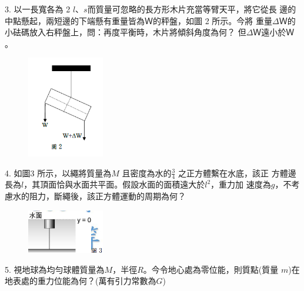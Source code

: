 \documentclass[cn,10pt,math=newtx,chinesefont=founder,device=ig]{elegantbook}
\begin{document}
\begin{example}
   3. 以一長寬各為 2 $l、s$而質量可忽略的長方形木片充當等臂天平，將它從長
邊的中點懸起，兩短邊的下端懸有重量皆為$Ｗ$的秤盤，如圖 2 所示。今將
重量$\Delta Ｗ$的小砝碼放入右秤盤上，問：再度平衡時，木片將傾斜角度為何？
但$\Delta Ｗ$遠小於$Ｗ$。\\
    \rightline{[高雄聯招教甄109]}
\end{example}
\begin{solution}
    
\end{solution}
\begin{figure}[htbp]
    \flushright
    \includegraphics[width=0.3\textwidth]{image/109高雄3.png}
  \end{figure}
\newpage

\begin{example}
   4. 如圖3 所示，以繩將質量為$M$ 且密度為水的$\frac{3}{4}$ 之正方體繫在水底，該正
方體邊長為$l$，其頂面恰與水面共平面。假設水面的面積遠大於$l^2$，重力加
速度為$g$，不考慮水的阻力，斷繩後，該正方體運動的周期為何？\\
    \rightline{[高雄聯招教甄109]}
\end{example}
\begin{solution}
    
\end{solution}
\begin{figure}[htbp]
    \flushright
    \includegraphics[width=0.3\textwidth]{image/109高雄4.png}
  \end{figure}
\newpage


\begin{example}
   5. 視地球為均勻球體質量為$M$，半徑$R$。今令地心處為零位能，則質點(質量
$m$)在地表處的重力位能為何？(萬有引力常數為$G$)\\
    \rightline{[高雄聯招教甄109]}
\end{example}
\begin{solution}
    
\end{solution}
\end{document}
